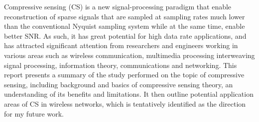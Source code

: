 Compressive sensing (CS) is a new signal-processing paradigm that enable reconstruction of sparse signals that are sampled at sampling rates much lower than the conventional Nyquist sampling system while at the same time, enable better SNR. As such, it has great potential for high data rate applications, and has attracted significant attention from researchers and engineers working in various areas such as wireless communication, multimedia processing interweaving signal processing, information theory, communications and networking. This report presents a summary of the study performed on the topic of compressive sensing, including background and basics of compressive sensing theory, an understanding of its benefits and limitations. It then outline potential application areas of CS in wireless networks, which is tentatively identified as the direction for my future work.

